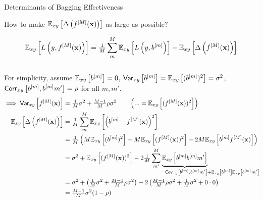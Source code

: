 \documentclass[11pt,compress,t,notes=noshow, xcolor=table]{beamer}
\begin{document}
\begin{vbframe}{Determinants of Bagging Effectiveness}

{\small How to make $\mathbb{E}_{xy}\left[\Delta\left(f^{[M]}(\mathbf{x})\right)\right]$ as large as possible?}
\begin{scriptsize}

$$\mathbb{E}_{xy}\left[L\left(y, f^{[M]}(\mathbf{x}) \right)\right] = \tfrac{1}{M}\sum^M_{m} \mathbb{E}_{xy}\left[L\left(y, b^{[m]} \right)\right] - \mathbb{E}_{xy}\left[\Delta\left(f^{[M]}(\mathbf{x})\right)\right]$$ \\
{\small For simplicity, assume $\mathbb{E}_{xy}\left[b^{[m]}\right] = 0$, $\mathsf{Var}_{xy}\left[b^{[m]}\right] = \mathbb{E}_{xy}\left[(b^{[m]})^2\right] = \sigma^2$, $\mathsf{Corr}_{xy}\left[b^{[m]}, b^{[m]}{m'}\right] = \rho$ for all $m, m'$.}
\begin{align*}
\implies 
\var_{xy}\left[\fM\right] &= \tfrac{1}{M} \sigma^2 +  \tfrac{M-1}{M} \rho \sigma^2 \qquad\left(... = \Exy\left[(\fM)^2\right]\right)\\
 \Exy\left[\ambifM\right] &= \tfrac{1}{M}\sum^M_{m} \Exy\left[\left(\bl- \fM\right)^2\right]\\
 & = \tfrac{1}{M}\left(M \Exy\left[(\bl)^2\right] + M \Exy\left[(\fM)^2\right] - 
     2 M \Exy\left[\bl\fM\right]\right) \\
  & = \sigma^2  + \Exy\left[(\fM)^2\right] - 2 \tfrac{1}{M}\sum^M_{m'} \underbrace{\Exy\left[\bl \bl{m'} \right]}_{\mathclap{\qquad\qquad\qquad\qquad= \cov_{xy}\left[\bl, \bl{m'} \right] + \Exy\left[\bl\right]\Exy\left[\bl{m'}\right]}} \\
  &=  \sigma^2  + \left(\tfrac{1}{M} \sigma^2 +   \tfrac{M-1}{M} \rho \sigma^2\right) - 2\left(\tfrac{M-1}{M} \rho\sigma^2 + \tfrac{1}{M}\sigma^2 + 0 \cdot 0 \right)\\
  &= \tfrac{M-1}{M} \sigma^2 (1-\rho)
\end{align*}
\end{scriptsize}


\end{vbframe}
\end{document}
